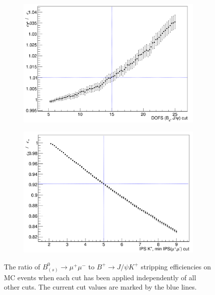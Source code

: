 \begin{figure}
    \begin{subfigure}[b]{0.4\textwidth}
        \includegraphics[width=\textwidth]{./Figs/Selection/DOFS.png}
        \caption{ }
        \label{fig:FD_ratio}
    \end{subfigure}
   \begin{subfigure}[b]{0.4\textwidth}
        \includegraphics[width=\textwidth]{./Figs/Selection/daug_IPS.png}
        \caption{ }
        \label{fig:IPS_ratio}
    \end{subfigure}
    \caption{The ratio of $B^{0}_{(s)}\to\mu^{+} \mu^{-}$ to $B^{+}\to J/\psi K^{+}$ stripping efficiencies on MC events when each cut has been applied independently of all other cuts. The current cut values are marked by the blue lines.}
    \label{fig:ratio_plots}
\end{figure}


